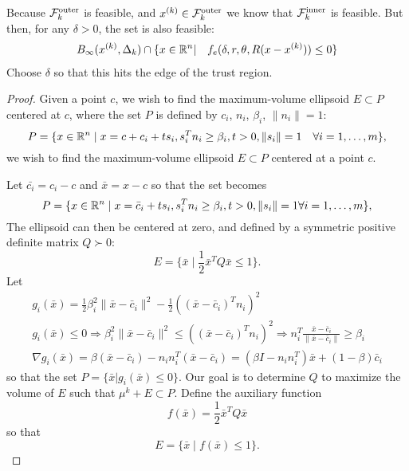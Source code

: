 Because ${\mathcal {F}^{\text{outer}}_k}$ is feasible, and ${x^{(k)}} \in {\mathcal {F}^{\text{outer}}_k}$ we know that $ {\mathcal {F}^{\text{inner}}_k} $ is feasible.
But then, for any $\delta > 0$, the set is also feasible:
\begin{align*}
B_{\infty}({x^{(k)}}, \Delta_k) \cap \{x \in {\mathbb R^{n}} | \quad f_e(\delta, r, \theta, R(x - {x^{(k)}})) \le 0\}
\end{align*}
Choose $\delta$ so that this hits the edge of the trust region.








\begin{theorem}
\end{theorem}

\begin{proof}
Given a point $c$, we wish to find the maximum-volume ellipsoid  $E \subset P$ centered at $c$, where the set $P$ is defined by $c_i$, $n_i$, $\beta_i$, $\|n_i\| = 1$:
\[
P = \{ x \in {\mathbb R^{n}} \; | \;  x = c + c_i + ts_i, s_i^Tn_i \ge \beta_i, t>0, \|s_i\| = 1\quad \forall i = 1,\ldots,m\},
\]
we wish to find the maximum-volume ellipsoid $E \subset P$ centered at a point $c$.


Let $\bar{c_i} = c_i - c$ and $\bar x = x - c$ so that the set becomes
\[
P = \{ x \in {\mathbb R^{n}} \; | \;  x = \bar c_i + ts_i, s_i^Tn_i \ge \beta_i, t>0, \|s_i\| = 1 \forall i = 1,\ldots,m\},
\]
The ellipsoid can then be centered at zero, and defined by a symmetric positive definite matrix $Q \succ 0$:
\[
E = \{ \bar x \; | \; \frac 1 2 \bar x^T Q \bar x \le 1 \}.
\]
Let 
\begin{align*}
g_i(\bar x) = \frac 1 2 \beta_i^2\|\bar x - \bar c_i\|^2 - \frac 1 2 \left((\bar x - \bar c_i)^Tn_i\right)^2 \\
g_i(\bar x) \le 0 
\Longrightarrow \beta_i^2\|\bar x - \bar c_i\|^2 \le \left((\bar x - \bar c_i)^Tn_i\right)^2 \Longrightarrow n_i^T\frac{\bar x - \bar c_i}{\|\bar x - \bar c_i\|}\ge \beta_i \\
\nabla g_i(\bar x) = \beta(\bar x - \bar c_i) - n_in_i^T(\bar x - \bar c_i) = (\beta I - n_i n_i^T) \bar x + (1 - \beta) \bar c_i
\end{align*}
so that the set $P = \{\bar x | g_i(\bar x) \le 0\}$.
Our goal is to determine $Q$ to maximize the volume of $E$ such that $\mu^{k} + E \subset P$.
Define the auxiliary function 
\[
f(\bar x) = \frac 1 2 \bar x^T Q \bar x
\]
so that 
\[
E = \{ \bar x \; | \; f(\bar x) \le 1 \}.
\]


\end{proof}
